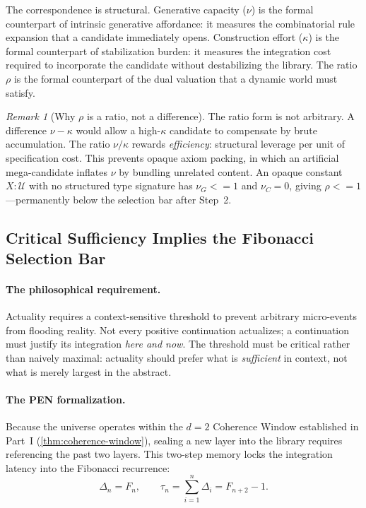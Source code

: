 \documentclass[11pt,a4paper]{article}
\def\leq{<=}%
\theoremstyle{plain}
\theoremstyle{definition}
\theoremstyle{remark}
\newtheorem{remark}[theorem]{Remark}
\newcommand{\U}{\mathcal{U}}
\begin{document}
The correspondence is structural.  Generative capacity ($\nu$) is the formal counterpart of intrinsic generative affordance: it measures the combinatorial rule expansion that a candidate immediately opens.  Construction effort ($\kappa$) is the formal counterpart of stabilization burden: it measures the integration cost required to incorporate the candidate without destabilizing the library.  The ratio $\rho$ is the formal counterpart of the dual valuation that a dynamic world must satisfy.

\begin{remark}[Why $\rho$ is a ratio, not a difference]
The ratio form is not arbitrary.  A difference $\nu - \kappa$ would allow a high-$\kappa$ candidate to compensate by brute accumulation.  The ratio $\nu / \kappa$ rewards \emph{efficiency}: structural leverage per unit of specification cost.  This prevents opaque axiom packing, in which an artificial mega-candidate inflates $\nu$ by bundling unrelated content.  An opaque constant $X : \U$ with no structured type signature has $\nu_G \leq 1$ and $\nu_C = 0$, giving $\rho \leq 1$---permanently below the selection bar after Step~2.
\end{remark}


\subsection{Critical Sufficiency Implies the Fibonacci Selection Bar}
\label{sec:fibonacci}

\paragraph{The philosophical requirement.}
Actuality requires a context-sensitive threshold to prevent arbitrary micro-events from flooding reality.  Not every positive continuation actualizes; a continuation must justify its integration \emph{here and now}.  The threshold must be critical rather than naively maximal: actuality should prefer what is \emph{sufficient} in context, not what is merely largest in the abstract.

\paragraph{The PEN formalization.}
Because the universe operates within the $d = 2$ Coherence Window established in Part~I (\cref{thm:coherence-window}), sealing a new layer into the library requires referencing the past two layers.  This two-step memory locks the integration latency into the Fibonacci recurrence:
\begin{equation}
\label{eq:fibonacci}
\Delta_n = F_n, \qquad \tau_n = \sum_{i=1}^{n} \Delta_i = F_{n+2} - 1.
\end{equation}
\end{document}
